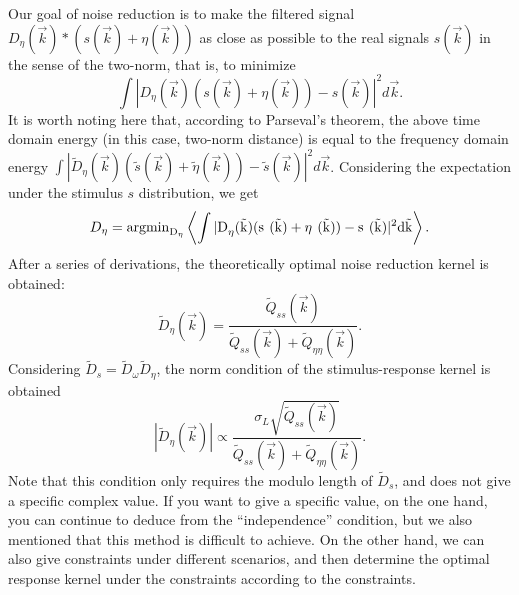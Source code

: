 Our goal of noise reduction is to make the filtered signal
$D_{\eta}(\vec{k})*(s(\vec{k})+\eta(\vec{k}))$ as close as possible to the real signals
$s(\vec{k})$ in the sense of the two-norm, that is, to minimize
\begin{equation}
  \int|D_\eta(\vec{k})(s(\vec{k})+\eta(\vec{k}))-s(\vec{k})|^2d\vec{k}.
\end{equation}
It is worth noting here that, according to Parseval's theorem, the
above time domain energy (in this case, two-norm distance) is equal to
the frequency domain energy $
\int|\tilde{D}_\eta(\vec{k})(\tilde{s}(\vec{k})+\tilde{\eta}(\vec{k}))-\tilde{s}(\vec{k})|^2d\vec{k}$. Considering
the expectation under the stimulus $s$ distribution, we get
\begin{equation}
D_\eta=\rm{argmin}_{D_\eta}\left<\int|D_\eta^{~}(\vec{k})(s^{~}(\vec{k})+\eta^{~}(\vec{k}))-s^{~}(\vec{k})|^2d\vec{k}\right>.
\end{equation}
After a series of derivations, the theoretically optimal noise
reduction kernel is obtained:
\begin{equation}
  \tilde{D}_{\eta} (\vec{k })   = \frac{\tilde{Q}_{ss} (\vec{k })    }{\tilde{Q}_{ss} (\vec{k })  +\tilde{Q}_{\eta \eta } (\vec{k })  }.
\end{equation}
Considering $ \tilde{D}_{s}= \tilde{D}_{\omega}
\tilde{D}_{\eta}$, the norm condition of the stimulus-response
kernel is obtained
\begin{equation}
  \label{eq: 4.47}
   \left\lvert\tilde{D}_{\eta} (\vec{k })   \right\rvert \propto  \frac{\sigma _L\sqrt{ \tilde{Q}_{ss} (\vec{k })  }  }{\tilde{Q}_{ss} (\vec{k })  +\tilde{Q}_{\eta \eta } (\vec{k })  }.
\end{equation}
Note that this condition only requires the modulo length of
$\tilde{D}_{s}$, and does not give a specific complex value. If you
want to give a specific value, on the one hand, you can continue to
deduce from the ``independence'' condition, but we also mentioned that
this method is difficult to achieve. On the other hand, we can also
give constraints under different scenarios, and then determine the
optimal response kernel under the constraints according to the
constraints.\\

